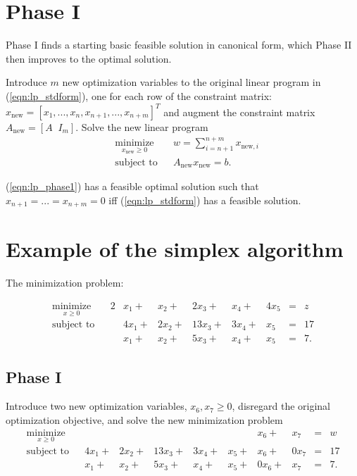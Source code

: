 \section{Phase I}
Phase I finds a starting basic feasible solution in canonical form, which Phase II then improves to the optimal solution.

Introduce $m$ new optimization variables to the original linear program in (\ref{eqn:lp_stdform}), one for each row of the constraint matrix: $x _\text{new}= \left[x_1,...,x_n,x_{n+1},...,x_{n+m}\right]^T$ and augment the constraint matrix $A_\text{new} = [A \;\; I_m]$. Solve the new linear program
\begin{equation}
\begin{aligned}
& \underset{x_\text{new} \geq 0}{\text{minimize}}
& & w = \sum_{i=n+1}^{n+m} x_{\text{new},i} \\
& \text{subject to}
& & A_\text{new}x_\text{new} = b.
\end{aligned}
\label{eqn:lp_phase1}
\end{equation}

\begin{theorem}
\label{thm:phase-opt}
(\ref{eqn:lp_phase1}) has a feasible optimal solution such that $x_{n+1} = ... = x_{n+m} = 0$ iff (\ref{eqn:lp_stdform}) has a feasible solution.
\end{theorem}

\section{Example of the simplex algorithm}

The minimization problem:

\begin{equation}
\begin{aligned}
\underset{x \geq 0}{\text{minimize}}
& & 2&x_1 + &x_2 + &2x_3 + &x_4 + &4x_5 &=& z \\
\text{subject to}
& & &4x_1 + &2x_2 + &13x_3 + &3x_4 + &x_5 &=& 17 \\
& & &x_1 + &x_2 + &5x_3 + &x_4 + &x_5 &=& 7.
\end{aligned}
\label{eqn:simplex_ex}
\end{equation}

\subsection{Phase I}
Introduce two new optimization variables, $x_6,x_7 \geq 0$, disregard the original optimization objective, and solve the new minimization problem
\begin{equation}
\begin{aligned}
\underset{x \geq 0}{\text{minimize}}
& &&&&& &x_6 + &x_7 &=& w \\
\text{subject to}
& &4x_1 + &2x_2 + &13x_3 + &3x_4 + &x_5 + &x_6 + &0x_7 &=& 17 \\
& &x_1 + &x_2 + &5x_3 + &x_4 + &x_5 + &0x_6 + &x_7 &=& 7.
\end{aligned}
\label{eqn:simplex_ex_new}
\end{equation}

